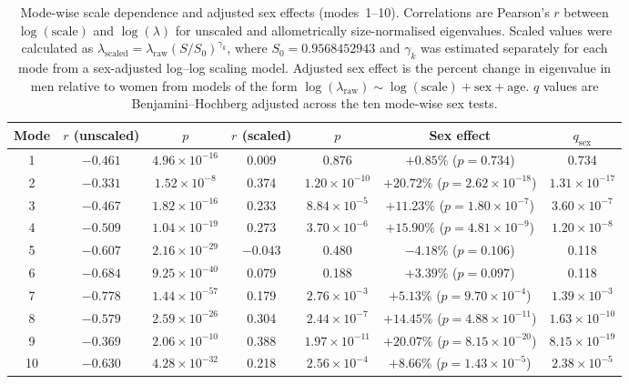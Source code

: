 \documentclass[openacc]{rsproca_new}
\begin{document}
\begin{table}[p]
\centering
\caption{Mode-wise scale dependence and adjusted sex effects (modes~1--10). Correlations are Pearson's $r$ between $\log(\mathrm{scale})$ and $\log(\lambda)$ for unscaled and allometrically size-normalised eigenvalues. Scaled values were calculated as $\lambda_{\mathrm{scaled}}=\lambda_{\mathrm{raw}}(S/S_0)^{\gamma_k}$, where $S_0=0.9568452943$ and $\gamma_k$ was estimated separately for each mode from a sex-adjusted log--log scaling model. Adjusted sex effect is the percent change in eigenvalue in men relative to women from models of the form $\log(\lambda_{\mathrm{raw}}) \sim \log(\mathrm{scale}) + \mathrm{sex} + \mathrm{age}$. $q$ values are Benjamini--Hochberg adjusted across the ten mode-wise sex tests.}
\label{tab:modes}
\scriptsize
\setlength{\tabcolsep}{3pt}
\begin{tabular}{ccccccc}
\toprule
Mode & $r$ (unscaled) & $p$ & $r$ (scaled) & $p$ & Sex effect & $q_{\mathrm{sex}}$ \\
\midrule
1  & $-0.461$ & $4.96 \times 10^{-16}$ & 0.009 & 0.876 & $+0.85\%$ ($p=0.734$) & 0.734 \\
2  & $-0.331$ & $1.52 \times 10^{-8}$  & 0.374 & $1.20 \times 10^{-10}$ & $+20.72\%$ ($p=2.62 \times 10^{-18}$) & $1.31 \times 10^{-17}$ \\
3  & $-0.467$ & $1.82 \times 10^{-16}$ & 0.233 & $8.84 \times 10^{-5}$  & $+11.23\%$ ($p=1.80 \times 10^{-7}$) & $3.60 \times 10^{-7}$ \\
4  & $-0.509$ & $1.04 \times 10^{-19}$ & 0.273 & $3.70 \times 10^{-6}$  & $+15.90\%$ ($p=4.81 \times 10^{-9}$) & $1.20 \times 10^{-8}$ \\
5  & $-0.607$ & $2.16 \times 10^{-29}$ & $-0.043$ & 0.480 & $-4.18\%$ ($p=0.106$) & 0.118 \\
6  & $-0.684$ & $9.25 \times 10^{-40}$ & 0.079 & 0.188 & $+3.39\%$ ($p=0.097$) & 0.118 \\
7  & $-0.778$ & $1.44 \times 10^{-57}$ & 0.179 & $2.76 \times 10^{-3}$  & $+5.13\%$ ($p=9.70 \times 10^{-4}$) & $1.39 \times 10^{-3}$ \\
8  & $-0.579$ & $2.59 \times 10^{-26}$ & 0.304 & $2.44 \times 10^{-7}$  & $+14.45\%$ ($p=4.88 \times 10^{-11}$) & $1.63 \times 10^{-10}$ \\
9  & $-0.369$ & $2.06 \times 10^{-10}$ & 0.388 & $1.97 \times 10^{-11}$ & $+20.07\%$ ($p=8.15 \times 10^{-20}$) & $8.15 \times 10^{-19}$ \\
10 & $-0.630$ & $4.28 \times 10^{-32}$ & 0.218 & $2.56 \times 10^{-4}$  & $+8.66\%$ ($p=1.43 \times 10^{-5}$) & $2.38 \times 10^{-5}$ \\
\bottomrule
\end{tabular}
\end{table}
\end{document}
